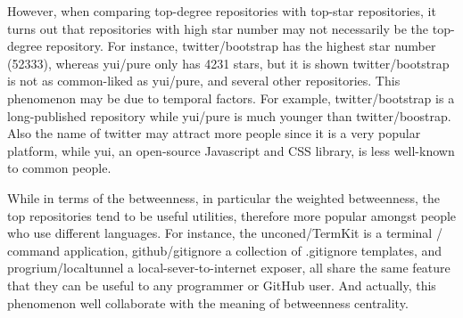 \documentclass[11pt]{article}
\begin{document}
However, when comparing top-degree repositories with top-star repositories, it turns out that repositories with high star number may not necessarily be the top-degree repository. For instance, twitter/bootstrap has the highest star number (52333), whereas yui/pure only has 4231 stars, but it is shown twitter/bootstrap is not as common-liked as yui/pure, and several other repositories. This phenomenon may be due to temporal factors. For example, twitter/bootstrap is a long-published repository while yui/pure is much younger than twitter/boostrap. Also the name of twitter may attract more people since it is a very popular platform, while yui, an open-source Javascript and CSS library, is less well-known to common people.

While in terms of the betweenness, in particular the weighted betweenness, the top repositories tend to be useful utilities, therefore more popular amongst people who use different languages. For instance, the unconed/TermKit is a terminal / command application, github/gitignore a collection of .gitignore templates, and progrium/localtunnel a local-sever-to-internet exposer, all share the same feature that they can be useful to any programmer or GitHub user. And actually, this phenomenon well collaborate with the meaning of betweenness centrality.
\end{document}

